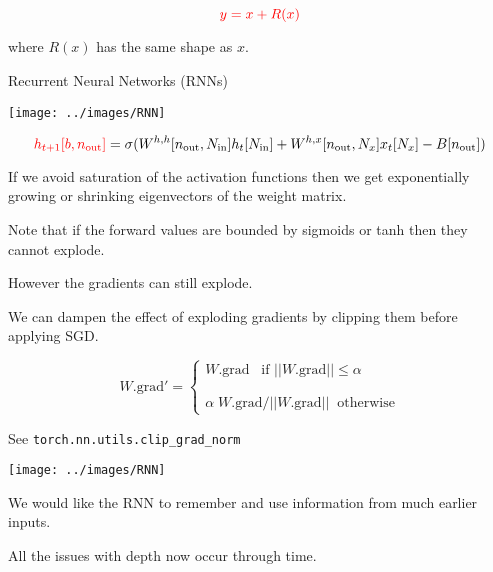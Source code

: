 {

$${\color{red} y = x + R(x)}$$

\vfill
where $R(x)$ has the same shape as $x$.

\slide{}
\vfill
\centerline{Recurrent Neural Networks (RNNs)}
\vfill
\vfill




\centerline{\texttt{[image: ../images/RNN]}}

\vfill

{\huge
$${\color{red} h_{t+1}[b,n_{\mathrm{out}}]} = \sigma(W^{h,h}[n_{\mathrm{out}},N_{\mathrm{in}}]h_t[N_{\mathrm{in}}] + W^{h,x}[n_{\mathrm{out}},N_x]x_t[N_x] - B[n_{\mathrm{out}}])$$
}


\vfill
If we avoid saturation of the activation functions then we get exponentially growing or shrinking eigenvectors of the weight matrix.

\vfill
Note that if the forward values are bounded by sigmoids or tanh then they cannot explode.

\vfill
However the gradients can still explode.


\vfill
We can dampen the effect of exploding gradients by clipping them before applying SGD.

\vfill
$$W.\mathrm{grad'} = \left\{\begin{array}{l} W.\mathrm{grad} \;\;\;\mbox{if $||W.\mathrm{grad}|| \leq \alpha$} \\
                                                      \\ \\
                                                      \alpha \; W.\mathrm{grad} / ||W.\mathrm{grad}|| \;\; \mbox{otherwise}
\end{array} \right.$$

\vfill
See {\tt torch.nn.utils.clip\_grad\_norm}


\centerline{\texttt{[image: ../images/RNN]}}

\vfill
We would like the RNN to {\color{red} remember and use} information from much earlier inputs.


\vfill
All the issues with depth now occur through time.

}
